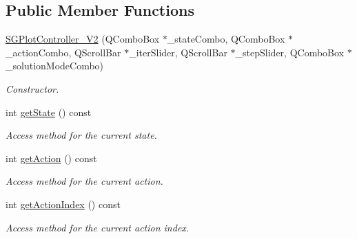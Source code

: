\subsection*{Public Member Functions}
\begin{DoxyCompactItemize}
\item 
\mbox{\label{classSGPlotController__V2_ab1ed25aaf2dce288131242db73a38317}} 
\hyperlink{classSGPlotController__V2_ab1ed25aaf2dce288131242db73a38317}{S\+G\+Plot\+Controller\+\_\+\+V2} (Q\+Combo\+Box $\ast$\+\_\+state\+Combo, Q\+Combo\+Box $\ast$\+\_\+action\+Combo, Q\+Scroll\+Bar $\ast$\+\_\+iter\+Slider, Q\+Scroll\+Bar $\ast$\+\_\+step\+Slider, Q\+Combo\+Box $\ast$\+\_\+solution\+Mode\+Combo)
\begin{DoxyCompactList}\small\item\em Constructor. \end{DoxyCompactList}\item 
\mbox{\label{classSGPlotController__V2_ae372dd39da9f733a8a50f57a52a159bb}} 
int \hyperlink{classSGPlotController__V2_ae372dd39da9f733a8a50f57a52a159bb}{get\+State} () const
\begin{DoxyCompactList}\small\item\em Access method for the current state. \end{DoxyCompactList}\item 
\mbox{\label{classSGPlotController__V2_aaddfae6fda7755460fc1fec3f19307b0}} 
int \hyperlink{classSGPlotController__V2_aaddfae6fda7755460fc1fec3f19307b0}{get\+Action} () const
\begin{DoxyCompactList}\small\item\em Access method for the current action. \end{DoxyCompactList}\item 
\mbox{\label{classSGPlotController__V2_a3f447b7556a51274e7d96d6e7af2b8fb}} 
int \hyperlink{classSGPlotController__V2_a3f447b7556a51274e7d96d6e7af2b8fb}{get\+Action\+Index} () const
\begin{DoxyCompactList}\small\item\em Access method for the current action index. \end{DoxyCompactList}\item 
\mbox{\label{classSGPlotController__V2_ae5d3ea93a15ececf05c3fb9cceba9f57}} 

\end{DoxyCompactItemize}
